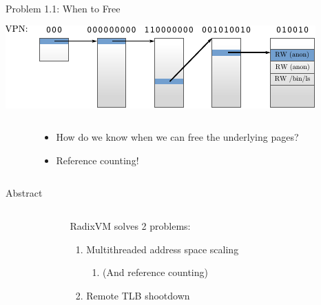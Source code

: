 \documentclass[aspectratio=169]{beamer}
\newcommand{\bi}{\begin{itemize}}
\newcommand{\ei}{\end{itemize}}
\newcommand{\bn}{\begin{enumerate}}
\newcommand{\en}{\end{enumerate}}
\begin{document}
\begin{frame}{Problem 1.1: When to Free}
  \begin{center}
  \includegraphics[scale=1.5]{./figures/radix.pdf}
  \end{center}
  \begin{columns}[T]
    \begin{column}{0.2\textwidth}
    \end{column}
    \begin{column}{0.6\textwidth}
      \bi
    \item How do we know when we can free the underlying pages?
      \pause
    \item Reference counting!
      \ei
    \end{column}
    \begin{column}{0.2\textwidth}
    \end{column}
  \end{columns}
\end{frame}

\begin{frame}{Abstract}
  \begin{columns}[T]
    \begin{column}{0.3\textwidth}
    \end{column}
    \begin{column}{0.4\textwidth}
      RadixVM solves 2 problems:
      \bn
    \item Multithreaded address space scaling
      \bn
    \item (And {reference counting})
      \en
    \item Remote TLB shootdown
      \en
    \end{column}
    \begin{column}{0.3\textwidth}
    \end{column}
  \end{columns}
\end{frame}
\end{document}
